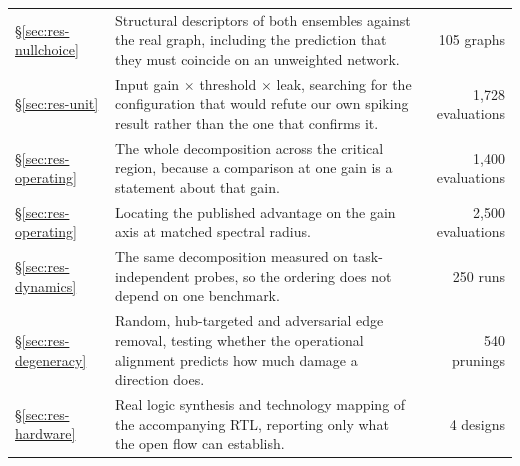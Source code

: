 \begin{table}[t]
\begin{tabular}{@{}l p{} r@{}}
\S\ref{sec:res-nullchoice} & Structural descriptors of both ensembles against the real graph, including the prediction that they must coincide on an unweighted network. & 105 graphs \\
\S\ref{sec:res-unit} & Input gain $\times$ threshold $\times$ leak, searching for the configuration that would refute our own spiking result rather than the one that confirms it. & 1,728 evaluations \\
\S\ref{sec:res-operating} & The whole decomposition across the critical region, because a comparison at one gain is a statement about that gain. & 1,400 evaluations \\
\S\ref{sec:res-operating} & Locating the published advantage on the gain axis at matched spectral radius. & 2,500 evaluations \\
\S\ref{sec:res-dynamics} & The same decomposition measured on task-independent probes, so the ordering does not depend on one benchmark. & 250 runs \\
\S\ref{sec:res-degeneracy} & Random, hub-targeted and adversarial edge removal, testing whether the operational alignment predicts how much damage a direction does. & 540 prunings \\
\S\ref{sec:res-hardware} & Real logic synthesis and technology mapping of the accompanying RTL, reporting only what the open flow can establish. & 4 designs \\
\bottomrule
\end{tabular}
\end{table}
